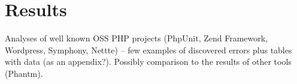 \chapter{Results}
Analyses of well known OSS PHP projects (PhpUnit, Zend Framework, 
Wordpress, Symphony, Nettte) -- few examples of discovered 
errors plus tables with data (as an appendix?). Possibly comparison 
to the results of other tools (Phantm).

